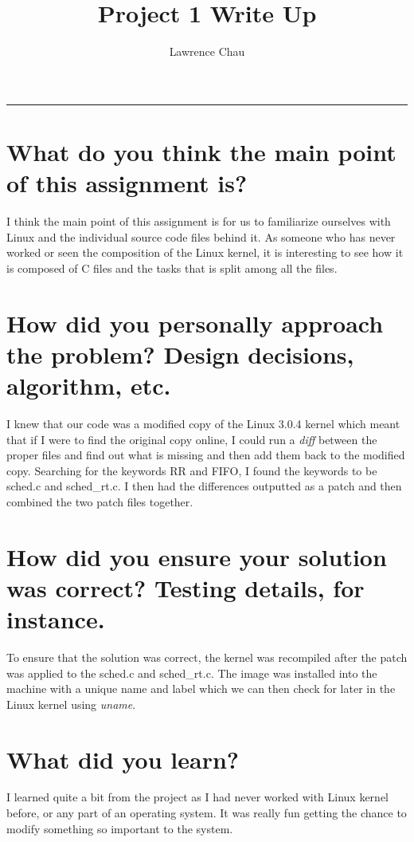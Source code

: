 \documentclass[letterpaper,10pt,notitlepage,fleqn]{article}
\title{Project 1 Write Up}
\author{Lawrence Chau}
\begin{document}
\maketitle
\hrule

\section*{What do you think the main point of this assignment is?}
I think the main point of this assignment is for us to familiarize ourselves with Linux and the individual source code files behind it. As someone who has never worked or seen the composition of the Linux kernel, it is interesting to see how it is composed of C files and the tasks that is split among all the files.
\section*{How did you personally approach the problem? Design decisions, algorithm, etc.}
I knew that our code was a modified copy of the Linux 3.0.4 kernel which meant that if I were to find the original copy online, I could run a \textit{diff} between the proper files and find out what is missing and then add them back to the modified copy. Searching for the keywords RR and FIFO, I found the keywords to be sched.c and sched\_rt.c. I then had the differences outputted as a patch and then combined the two patch files together.

\section*{How did you ensure your solution was correct? Testing details, for instance.}
To ensure that the solution was correct, the kernel was recompiled after the patch was applied to the sched.c and sched\_rt.c. The image was installed into the machine with a unique name and label which we can then check for later in the Linux kernel using \textit{uname}. 
 
\section*{What did you learn?}
I learned quite a bit from the project as I had never worked with Linux kernel before, or any part of an operating system. It was really fun getting the chance to modify something so important to the system.  
\end{document}
